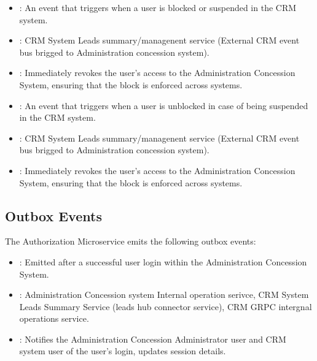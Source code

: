 \documentclass[letterpaper,10pt,english]{sphinxmanual}
\begin{document}
\sphinxAtStartPar
{}
\begin{itemize}
\item {} 
\sphinxAtStartPar
{}: An event that triggers when a user is blocked or suspended in the CRM system.

\item {} 
\sphinxAtStartPar
{}: CRM System \textendash{} Leads summary/managenent service  (External CRM event bus brigged to Administration concession system).

\item {} 
\sphinxAtStartPar
{}: Immediately revokes the user’s access to the Administration Concession System, ensuring that the block is enforced across systems.

\end{itemize}

\sphinxAtStartPar
{}
\begin{itemize}
\item {} 
\sphinxAtStartPar
{}: An event that triggers when a user is unblocked in case of being suspended in the CRM system.

\item {} 
\sphinxAtStartPar
{}: CRM System \textendash{} Leads summary/managenent service  (External CRM event bus brigged to Administration concession system).

\item {} 
\sphinxAtStartPar
{}: Immediately revokes the user’s access to the Administration Concession System, ensuring that the block is enforced across systems.

\end{itemize}


\subsection{Outbox Events}
\label{\detokenize{administration_concession_system/authorization_service:outbox-events}}
\sphinxAtStartPar
The Authorization Microservice emits the following outbox events:

\sphinxAtStartPar
{}
\begin{itemize}
\item {} 
\sphinxAtStartPar
{}: Emitted after a successful user login within the Administration Concession System.

\item {} 
\sphinxAtStartPar
{}: Administration Concession system Internal operation serivce, CRM System Leads Summary Service (leads hub connector service), CRM GRPC intergnal operations service.

\item {} 
\sphinxAtStartPar
{}: Notifies the Administration Concession Administrator user and CRM system user of the user’s login, updates session details.

\end{itemize}
\end{document}
